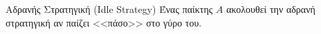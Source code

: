 {}
\begin{definitiongr}{Αδρανής Στρατηγική \textlatin{(Idle Strategy)}}
  Ένας παίκτης $A$ ακολουθεί την αδρανή στρατηγική αν παίζει <<πάσο>> στο γύρο του.
\end{definitiongr}

